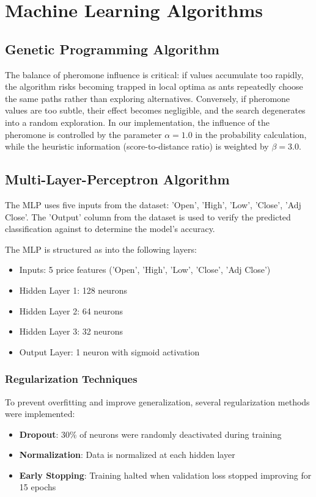 \documentclass[a4paper,12pt]{article}
\begin{document}
\section{Machine Learning Algorithms}

\subsection{Genetic Programming Algorithm}
The balance of pheromone influence is critical: if values accumulate too rapidly, the algorithm risks becoming trapped in local optima as ants repeatedly choose the same paths rather than exploring alternatives. Conversely, if pheromone values are too subtle, their effect becomes negligible, and the search degenerates into a random exploration. In our implementation, the influence of the pheromone is controlled by the parameter $\alpha = 1.0$ in the probability calculation, while the heuristic information (score-to-distance ratio) is weighted by $\beta = 3.0$.

\subsection{Multi-Layer-Perceptron Algorithm}
The MLP uses five inputs from the dataset: 'Open', 'High', 'Low', 'Close', 'Adj Close'. The 'Output' column from the dataset is used to verify the predicted classification against to determine the model's accuracy.

The MLP is structured as into the following layers:
\begin{itemize}
\item Inputs: 5 price features ('Open', 'High', 'Low', 'Close', 'Adj Close')
\item Hidden Layer 1: 128 neurons
\item Hidden Layer 2: 64 neurons 
\item Hidden Layer 3: 32 neurons
\item Output Layer: 1 neuron with sigmoid activation
\end{itemize}

\subsubsection{Regularization Techniques}
To prevent overfitting and improve generalization, several regularization methods were implemented:
\begin{itemize}
\item \textbf{Dropout}: 30\% of neurons were randomly deactivated during training
\item \textbf{Normalization}: Data is normalized at each hidden layer
\item \textbf{Early Stopping}: Training halted when validation loss stopped improving for 15 epochs
\end{itemize}
\end{document}
